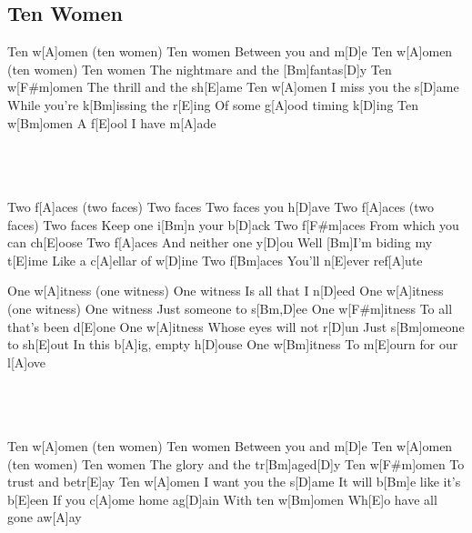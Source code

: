 \subsection*{Ten Women   }
\begin{guitar}
\begin{multicols}{2}
Ten w[A]omen (ten women)
Ten women
Between you and m[D]e
Ten w[A]omen (ten women)
Ten women
The nightmare and the [Bm]fantas[D]y
Ten w[F#m]omen
The thrill and the sh[E]ame
Ten w[A]omen
I miss you the s[D]ame
While you're k[Bm]issing the r[E]ing
Of some g[A]ood timing k[D]ing
Ten w[Bm]omen
A f[E]ool I have m[A]ade



\\\\\\


Two f[A]aces (two faces)
Two faces
Two faces you h[D]ave
Two f[A]aces (two faces)
Two faces
Keep one i[Bm]n your b[D]ack
Two f[F#m]aces
From which you can ch[E]oose
Two f[A]aces
And neither one y[D]ou
Well [Bm]I'm biding my t[E]ime
Like a c[A]ellar of w[D]ine
Two f[Bm]aces
You'll n[E]ever ref[A]ute


\columnbreak

One w[A]itness (one witness)
One witness
Is all that I n[D]eed
One w[A]itness (one witness)
One witness
Just someone to s[Bm,D]ee
One w[F#m]itness
To all that's been d[E]one
One w[A]itness
Whose eyes will not r[D]un
Just s[Bm]omeone to sh[E]out
In this b[A]ig, empty h[D]ouse
One w[Bm]itness
To m[E]ourn for our l[A]ove


\\\\\\



Ten w[A]omen (ten women)
Ten women
Between you and m[D]e
Ten w[A]omen (ten women)
Ten women
The glory and the tr[Bm]aged[D]y
Ten w[F#m]omen
To trust and betr[E]ay
Ten w[A]omen
I want you the s[D]ame
It will b[Bm]e like it's b[E]een
If you c[A]ome home ag[D]ain
With ten w[Bm]omen
Wh[E]o have all gone aw[A]ay
\end{multicols}
\end{guitar}
